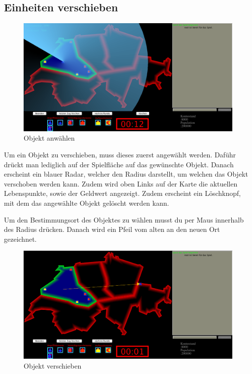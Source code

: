 \documentclass[ngerman, 12pt, pdftex]{scrartcl}[2006/07/30]
\begin{document}
\newpage

\subsection{Einheiten verschieben}

\begin{figure}[h]
\centering
\includegraphics[scale=0.29]{spiel/Objekt_anwaehlen.png}
\caption{Objekt anw\"{a}hlen}
\end{figure}

Um ein Objekt zu verschieben, muss dieses zuerst angew\"{a}hlt werden. Daf\"{u}hr drückt man lediglich auf der Spielfläche auf das gewünschte Objekt. Danach erscheint ein blauer Radar, welcher den Radius darstellt, um welchen das Objekt verschoben werden kann. Zudem wird oben Links auf der Karte die aktuellen Lebenspunkte, sowie der Geldwert angezeigt. Zudem erscheint ein Löschknopf, mit dem das angewählte Objekt gelöscht werden kann.

Um den Bestimmungsort des Objektes zu wählen musst du per Maus innerhalb des Radius drücken. Danach wird ein Pfeil vom alten an den neuen Ort gezeichnet.
\begin{figure}[h]
\centering
\includegraphics[scale=0.29]{spiel/Objekt_verschieben.png}
\caption{Objekt verschieben}
\end{figure}
\end{document}
